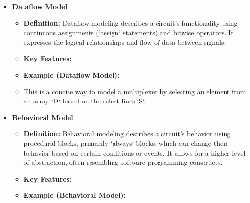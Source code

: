 \documentclass{article}
\begin{document}
\begin{itemize}
    \item \textbf{Dataflow Model}
    
    \begin{itemize}
        \item \textbf{Definition:} Dataflow modeling describes a circuit's functionality using continuous assignments (`assign` statements) and bitwise operators. It expresses the logical relationships and flow of data between signals.
        \item \textbf{Key Features:}
        
        \item \textbf{Example (Dataflow Model):}
        
        \item This is a concise way to model a multiplexer by selecting an element from an array `D` based on the select lines `S`.
    \end{itemize}
    
    \item \textbf{Behavioral Model}
    
    \begin{itemize}
        \item \textbf{Definition:} Behavioral modeling describes a circuit's behavior using procedural blocks, primarily `always` blocks, which can change their behavior based on certain conditions or events. It allows for a higher level of abstraction, often resembling software programming constructs.
        \item \textbf{Key Features:}
        
        \item \textbf{Example (Behavioral Model):}
        

\end{itemize}
\end{itemize}
\end{document}
